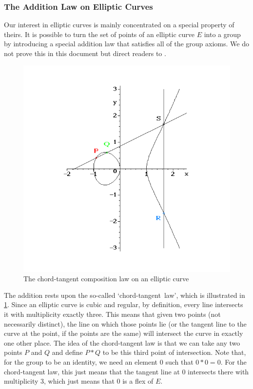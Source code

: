 \subsubsection{The Addition Law on Elliptic Curves}
Our interest in elliptic curves is mainly concentrated on a special property of theirs.
It is possible to turn the set of points of an elliptic curve $E$ into a group by introducing a special addition law that satisfies all of the group axioms.
We do not prove this in this document but direct readers to \cite{silverman2009}.
\begin{figure}[htbp]
	\centering
	\includegraphics[scale=0.5]{../Figures/addition.png}
	\caption{The chord-tangent composition law on an elliptic curve}
	\label{chord-tangent}
\end{figure}
The addition rests upon the so-called `chord-tangent~law', which is illustrated in \cref{chord-tangent}.
Since an elliptic curve is cubic and regular, by definition, every line intersects it with multiplicity exactly three.
This means that given two points (not necessarily distinct), the line on which those points lie (or the tangent line to the curve at the point, if the points are the same) will intersect the curve in exactly one other place.
The idea of the chord-tangent law is that we can take any two points $P$ and $Q$ and define $P * Q$ to be this third point of intersection.
Note that, for the group to be an identity, we need an element $0$ such that $0 * 0 = 0$.
For the chord-tangent law, this just means that the tangent line at $0$ intersects there with multiplicity 3, which just means that $0$ is a flex of $E$.

